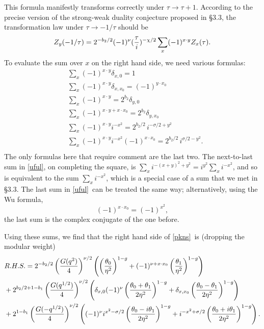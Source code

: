 \documentclass[12pt]{article}
\numberwithin{equation}{section}
\begin{document}
This formula manifestly transforms correctly under $\tau\to\tau+1$.
According to the precise version of the strong-weak duality conjecture
proposed in \S3.3, the transformation law under
$\tau\to -1/\tau$ should be
%
\begin{equation}
  \label{pkns}
  Z_y(-1/\tau)=2^{-b_2/2}(-1)^{\nu}({\tau \over i})^{-\chi /2}
  \sum_x(-1)^{x\cdot y}Z_x(\tau).
\end{equation}
%
To evaluate the sum over $x$ on the right hand side, we need
various formulas:
\begin{equation}
  \label{uful}
  \begin{aligned}&\sum_x(-1)^{x\cdot y}\delta_{x,0}  = 1
    \\ &\sum_x(-1)^{x\cdot y}\delta_{x,x_0}  = (-1)^{y\cdot
    x_0}\\ &\sum_x (-1)^{x\cdot y}  =2^{b_2}\delta_{y,0} \\ &\sum_x
    (-1)^{x\cdot y +x\cdot x_0}  =2^{b_2}\delta_{y,x_0}\\ &\sum_x
    (-1)^{x\cdot y}i^{-x^2}  = 2^{b_2/2}\,i^{-\sigma/2+y^2}\\ &\sum_x
    (-1)^{x\cdot y}i^{-x^2}(-1)^{x\cdot x_0}  = 2^{b_2/2}\,
    i^{\sigma/2-y^2} . \\
  \end{aligned}
\end{equation}
The only formulas here that require comment are the last two.
The next-to-last sum in \eqref{uful}, on completing the square,
is $\sum_xi^{-(x+y)^2+y^2}=i^{y^2}\sum_xi^{-x^2}$, and
so is equivalent to the sum $\sum_xi^{-x^2}$, which is a special
case of a sum that we met
in \S3.3.  The last sum in \eqref{uful}\ can be treated the same
way; alternatively, using the Wu formula,
\begin{equation}
  \label{wuformula}
  (-1)^{x\cdot x_0}= (-1)^{x^2},
\end{equation}
the last sum is the complex conjugate
of the one before.

Using these sums,
we find that the right hand side of \eqref{pkns}\ is (dropping the
modular weight)
\begin{equation}
  \label{undergop}
  \begin{aligned}&{\mit R.H.S.} = 2^{-b_2/2}\left({G(q^2)\over
    4}\right)^{\nu/2}
    \left(\left({\theta_0\over\eta^2}\right)^{1-g}+(-1)^{\nu+x\cdot
    x_0} \left({\theta_1\over\eta^2}\right)^{1-g}\right) \\ &
    +2^{b_2/2+1-b_1} \left({G(q^{1/2})\over 4} \right)^{\nu/2}
    \left(\delta_{x,0}(-1)^\nu \left({\theta_0  +\theta_1\over
      2\eta^2}\right)^{1-g}  +
      \delta_{x,x_0}\left({\theta_0-\theta_1\over
    2\eta^2}\right)^{1-g}\right) \\ &+2^{1-b_1}
    \left({G(-q^{1/2})\over 4}\right)^{\nu/2}\left( (-1)^\nu
      i^{x^2-\sigma/2} \left({\theta_0-i\theta_1\over
      2\eta^2}\right)^{1-g} + i^{-x^2+\sigma/2}
    \left({\theta_0+i\theta_1\over 2\eta^2}\right)^{1-g}\right).\\
  \end{aligned}
\end{equation}
\end{document}
